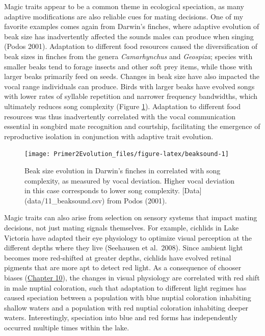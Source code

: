 \documentclass[
]{book}
\begin{document}
Magic traits appear to be a common theme in ecological speciation, as many adaptive modifications are also reliable cues for mating decisions. One of my favorite examples comes again from Darwin's finches, where adaptive evolution of beak size has inadvertently affected the sounds males can produce when singing (Podos 2001). Adaptation to different food resources caused the diversification of beak sizes in finches from the genera \emph{Camarhynchus} and \emph{Geospiza}; species with smaller beaks tend to forage insects and other soft prey items, while those with larger beaks primarily feed on seeds. Changes in beak size have also impacted the vocal range individuals can produce. Birds with larger beaks have evolved songs with lower rates of syllable repetition and narrower frequency bandwidths, which ultimately reduces song complexity (Figure \ref{fig:beaksound}). Adaptation to different food resources was thus inadvertently correlated with the vocal communication essential in songbird mate recognition and courtship, facilitating the emergence of reproductive isolation in conjunction with adaptive trait evolution.

\begin{figure}
\texttt{[image: Primer2Evolution\_files/figure-latex/beaksound-1]} \caption{Beak size evolution in Darwin's finches in correlated with song complexity, as measured by vocal deviation. Higher vocal deviation in this case corresponds to lower song complexity. [Data](data/11_beaksound.csv) from Podos (2001).}\label{fig:beaksound}
\end{figure}

Magic traits can also arise from selection on sensory systems that impact mating decisions, not just mating signals themselves. For example, cichlids in Lake Victoria have adapted their eye physiology to optimize visual perception at the different depths where they live (Seehausen et al.~2008). Since ambient light becomes more red-shifted at greater depths, cichlids have evolved retinal pigments that are more apt to detect red light. As a consequence of chooser biases (\href{social-behavior-and-sexual-selection.html\#chooser-biases}{Chapter 10}), the changes in visual physiology are correlated with red shift in male nuptial coloration, such that adaptation to different light regimes has caused speciation between a population with blue nuptial coloration inhabiting shallow waters and a population with red nuptial coloration inhabiting deeper waters. Interestingly, speciation into blue and red forms has independently occurred multiple times within the lake.
\end{document}
